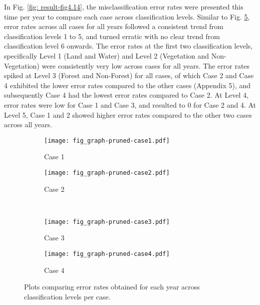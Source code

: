 In Fig. \ref{fig: result-fig4.14}, the misclassification error rates were presented this time per year to compare each case across classification levels. Similar to Fig. \ref{fig: result-fig4.13}, error rates across all cases for all years followed a consistent trend from classification levels 1 to 5, and turned erratic with no clear trend from classification level 6 onwards. The error rates at the first two classification levels, specifically Level 1 (Land and Water) and Level 2 (Vegetation and Non-Vegetation) were consistently very low across cases for all years. The error rates spiked at Level 3 (Forest and Non-Forest) for all cases, of which Case 2 and Case 4 exhibited the lower error rates compared to the other cases (Appendix 5), and subsequently Case 4 had the lowest error rates compared to Case 2. At Level 4, error rates were low for Case 1 and Case 3, and resulted to 0 for Case 2 and 4. At Level 5, Case 1 and 2 showed higher error rates compared to the other two cases across all years.\\

\begin{figure}[!ht] \centering
	\captionsetup[subfigure]{width=2.0in} %
	\begin{subfigure}[t]{0.49\textwidth}
		\texttt{[image: fig\_graph-pruned-case1.pdf]}
		\caption[Error rates across levels per case.]{Case 1}
		\label{fig: result-fig4.13a}
	\end{subfigure}
	\begin{subfigure}[t]{0.49\textwidth}
		\texttt{[image: fig\_graph-pruned-case2.pdf]}
		\caption[Error rates across levels per case.]{Case 2}
		\label{fig: result-fig4.13b}
	\end{subfigure}\\
	\vspace{15pt}
	\begin{subfigure}[t]{0.49\textwidth}
		\texttt{[image: fig\_graph-pruned-case3.pdf]}
		\caption[Error rates across levels per case.]{Case 3}
		\label{fig: result-fig4.13c}
	\end{subfigure}
	\begin{subfigure}[t]{0.49\textwidth}
		\texttt{[image: fig\_graph-pruned-case4.pdf]}
		\caption[Error rates across levels per case.]{Case 4}
		\label{fig: result-fig4.13d}
	\end{subfigure}
	\vspace{5pt}
	\caption[Plots comparing error rates obtained for each year across classification levels per case.]{Plots comparing error rates obtained for each year across classification levels per case.}
	\label{fig: result-fig4.13}
\end{figure}

